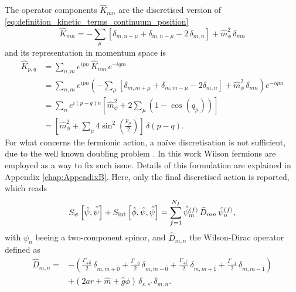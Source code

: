 The operator components $\widehat{K}_{mn}$ are the discretised version of \eqref{eq:definition_kinetic_terms_continuum_position}
\begin{equation}
    \widehat{K}_{mn} = - \sum_\mu \left[\delta_{m,n+\mu} + \delta_{m,n-\mu} - 2 \, \delta_{m,n}\right] + \hat{m}_\phi^2 \, \delta_{mn} 
    \label{eq:discretised_kinetic_op_bosons}
\end{equation}
and its representation in momentum space is
\begin{equation*}
	\begin{aligned}
		\widehat{K}_{p, q} & =\sum_{n, m} e^{i p n} \, \widehat{K}_{n m} \, e^{-i q m} \\
		& =\sum_{n, m} e^{i p n}\left(-\sum_\mu\left[\delta_{m,m+\mu}+\delta_{m,m-\mu}-2 \delta_{m, n}\right] + \hat{m}_\phi^2 \, \delta_{mn}\right) e^{-i q m} \\
		& =\sum_{n} e^{i(p-q) n}\left[\hat{m}_\phi^2+2\sum_\mu \left(1-\cos \left(q_\mu\right)\right)\right] \\
		& = \left[\hat{m}_\phi^2 + \sum_\mu 4 \sin ^2\left(\frac{p_\mu}{2}\right) \right] \, \delta(p-q) .
	\end{aligned}
\end{equation*}
For what concerns the fermionic action, a na\"ive discretisation is not sufficient, due to the well known doubling problem \cite{rothe_LGT,Montvay1994QuantumLattice}. In this work Wilson fermions \cite{wilson_lqcd} are employed as a way to fix such issue. Details of this formulation are explained in Appendix \ref{chap:AppendixB}. Here, only the final discretised action is reported, which reads
\begin{equation}
		S_\psi\left[\hat{\psi}, \hat{\bar{\psi}} \right] + S_\text{int}\left[\hat{\phi}, \hat{\psi}, \hat{\bar{\psi}} \right] = \sum_{f=1}^{N_f}\hat{\bar{\psi}}_m^{(f)} \, \widehat{D}_{mn} \, \hat{\psi}_n^{(f)},
\end{equation}
with $\psi_n$ beeing a two-component spinor, and $\widehat{D}_{m,n}$ the Wilson-Dirac operator defined as 
\begin{equation}
    \begin{aligned}
    \widehat{D}_{m, n} = &- \left(\frac{\Gamma_{+\hat 0}}{2} \, \delta_{m, m+\hat 0} +\frac{\Gamma_{-\hat 0}}{2} \, \delta_{m, m-\hat 0} + \frac{\Gamma_{+\hat 1}}{2} \, \delta_{m, m+\hat 1} + \frac{\Gamma_{- \hat 1}}{2} \, \delta_{m, m-\hat 1}\right)  \\
     &+ \left(2ar + \hat m + \hat g \phi\right) \, \delta_{s,s'} \, \delta_{m,n}. \\
    \end{aligned}
    \label{eq:wilson-dirac_operator}
\end{equation}
